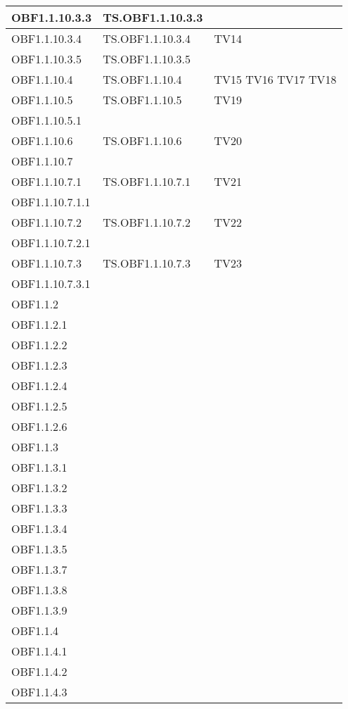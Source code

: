 \documentclass{scalatekids-article}
\begin{document}
\begin{longtable}[H]{|l|p{4cm}|p{4cm}|}
  OBF1.1.10.3.3 & TS.OBF1.1.10.3.3 & \\
  \hline
  OBF1.1.10.3.4 & TS.OBF1.1.10.3.4 & TV14\\
  \hline
  OBF1.1.10.3.5 & TS.OBF1.1.10.3.5 & \\
  \hline
  OBF1.1.10.4 & TS.OBF1.1.10.4 & TV15 TV16 TV17 TV18\\
  \hline
  OBF1.1.10.5 & TS.OBF1.1.10.5 & TV19\\
  \hline
  OBF1.1.10.5.1 & & \\
  \hline
  OBF1.1.10.6 & TS.OBF1.1.10.6 & TV20\\
  \hline
  OBF1.1.10.7 & & \\
  \hline
  OBF1.1.10.7.1 & TS.OBF1.1.10.7.1 & TV21\\
  \hline
  OBF1.1.10.7.1.1 & & \\
  \hline
  OBF1.1.10.7.2 & TS.OBF1.1.10.7.2 & TV22\\
  \hline
  OBF1.1.10.7.2.1 & & \\
  \hline
  OBF1.1.10.7.3 & TS.OBF1.1.10.7.3 & TV23\\
  \hline
  OBF1.1.10.7.3.1 & & \\
  \hline
  OBF1.1.2 & & \\
  \hline
  OBF1.1.2.1 & & \\
  \hline
  OBF1.1.2.2 &  & \\
  \hline
  OBF1.1.2.3 &  & \\
  \hline
  OBF1.1.2.4 &  & \\
  \hline
  OBF1.1.2.5 &  & \\
  \hline
  OBF1.1.2.6 &  & \\
  \hline
  OBF1.1.3 &  & \\
  \hline
  OBF1.1.3.1 &  &\\
  \hline
  OBF1.1.3.2 &  &\\
  \hline
  OBF1.1.3.3 &  &\\
  \hline
  OBF1.1.3.4 &  &\\
  \hline
  OBF1.1.3.5 &  &\\
  \hline
  OBF1.1.3.7 &  &\\
  \hline
  OBF1.1.3.8 &  &\\
  \hline
  OBF1.1.3.9 &  &\\
  \hline
  OBF1.1.4 &  &\\
  \hline
  OBF1.1.4.1 &  &\\
  \hline
  OBF1.1.4.2 &  &\\
  \hline
  OBF1.1.4.3 &  &\\

\end{longtable}
\end{document}
